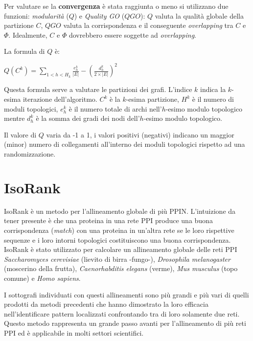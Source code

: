 \documentclass[11pt]{article}
\begin{document}
Per valutare se la \textbf{convergenza} è stata raggiunta o meno si utilizzano due funzioni: \textit{modularità} ($Q$) e \textit{Quality GO} ($QGO$): $Q$ valuta la qualità globale della partizione $C$, $QGO$ valuta la corrispondenza e il conseguente \textit{overlapping} tra $C$ e $\Phi$. Idealmente, $C$ e $\Phi$ dovrebbero essere soggette ad \textit{overlapping}.

La formula di $Q$ è:

\begin{center}
$Q(C^k) = \displaystyle{\sum_{1<h<H_k}\frac{e^k_h}{|E|} - \left(\frac{d^k_h}{2 \times |E|}\right)^2}$
\end{center}

Questa formula serve a valutare le partizioni dei grafi. L'indice $k$ indica la $k$-esima iterazione dell'algoritmo. $C^k$ è la $k$-esima partizione, $H^k$ è il numero di moduli topologici, $e^k_h$ è il numero totale di archi nell'$h$-esimo modulo topologico mentre $d^k_h$ è la somma dei gradi dei nodi dell'$h$-esimo modulo topologico. 

Il valore di $Q$ varia da -1 a 1, i valori positivi (negativi) indicano un maggior (minor) numero di collegamenti all'interno dei moduli topologici rispetto ad una randomizzazione. 

%

\pagebreak
\section{IsoRank}
IsoRank è un metodo per l'allineamento globale di più PPIN. L'intuizione da tener presente è che una proteina in una rete PPI produce una buona corrispondenza (\textit{match}) con una proteina in un'altra rete se le loro rispettive sequenze e i loro intorni topologici costituiscono una buona corrispondenza. IsoRank è stato utilizzato per calcolare un allineamento globale delle reti PPI \textit{Saccharomyces cerevisiae} (lievito di birra -fungo-), \textit{Drosophila melanogaster} (moscerino della frutta), \textit{Caenorhabditis elegans} (verme), \textit{Mus musculus} (topo comune) e \textit{Homo sapiens}.

I sottografi individuati con questi allineamenti sono più grandi e più vari di quelli prodotti da metodi precedenti che hanno dimostrato la loro efficacia nell'identificare pattern localizzati confrontando tra di loro solamente due reti. Questo metodo rappresenta un grande passo avanti per l'allineamento di più reti PPI ed è applicabile in molti settori scientifici.
\end{document}
